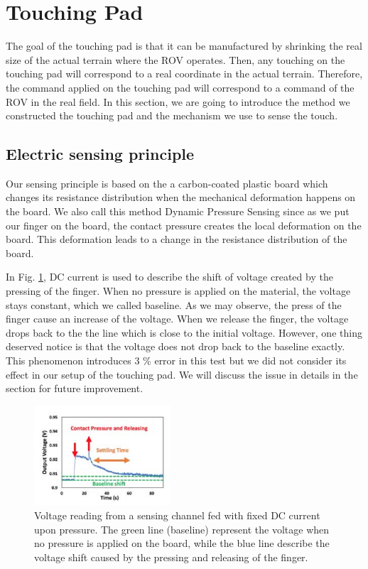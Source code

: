 \documentclass[reprint,amsmath, amsfonts, amssymb, aps, letterpaper]{revtex4-1}
\begin{document}
\section{Touching Pad}
The goal of the touching pad is that it can be manufactured by shrinking the real size of the actual terrain where the ROV operates. Then, any touching on the touching pad will correspond to a real coordinate in the actual terrain. Therefore, the command applied on the touching pad will correspond to a command of the ROV in the real field. In this section, we are going to introduce the method we constructed the touching pad and the mechanism we use to sense the touch.

\subsection{Electric sensing principle}
Our sensing principle is based on the a carbon-coated plastic board which changes its resistance distribution when the mechanical deformation happens on the board. We also call this method Dynamic Pressure Sensing since as we put our finger on the board, the contact pressure creates the local deformation on the board. This deformation leads to a change in the resistance distribution of the board. 

In Fig. \ref{fig::pressure}, DC current is used to describe the shift of voltage created by the pressing of the finger. When no pressure is applied on the material, the voltage stays constant, which we called baseline. As we may observe, the press of the finger cause an increase of the voltage. When we release the finger, the voltage drops back to the the line which is close to the initial voltage. However, one thing deserved notice is that the voltage does not drop back to the baseline exactly. This phenomenon introduces 3 \% error in this test but we did not consider its effect in our setup of the touching pad. We will discuss the issue in details in the section for future improvement.

\begin{figure}[h]
\centering
    \includegraphics[width=0.45\textwidth]{./figure/pressure}     
       \caption{Voltage reading from a sensing channel fed with fixed DC current upon pressure. The green line (baseline) represent the voltage when no pressure is applied on the board, while the blue line describe the voltage shift caused by the pressing and releasing of the finger. \citep{isoft} }
    \label{fig::pressure}
\end{figure}
\end{document}
